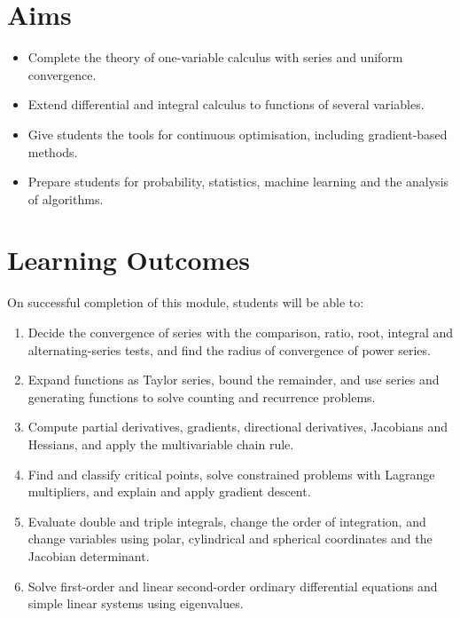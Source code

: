 \documentclass[11pt,a4paper]{article}
\begin{document}
\section{Aims}
\begin{itemize}
  \item Complete the theory of one-variable calculus with series and uniform convergence.
  \item Extend differential and integral calculus to functions of several variables.
  \item Give students the tools for continuous optimisation, including gradient-based methods.
  \item Prepare students for probability, statistics, machine learning and the analysis of algorithms.
\end{itemize}

\section{Learning Outcomes}
On successful completion of this module, students will be able to:
\begin{enumerate}[label=LO\arabic*.]
  \item Decide the convergence of series with the comparison, ratio, root, integral and alternating-series tests, and find the radius of convergence of power series.
  \item Expand functions as Taylor series, bound the remainder, and use series and generating functions to solve counting and recurrence problems.
  \item Compute partial derivatives, gradients, directional derivatives, Jacobians and Hessians, and apply the multivariable chain rule.
  \item Find and classify critical points, solve constrained problems with Lagrange multipliers, and explain and apply gradient descent.
  \item Evaluate double and triple integrals, change the order of integration, and change variables using polar, cylindrical and spherical coordinates and the Jacobian determinant.
  \item Solve first-order and linear second-order ordinary differential equations and simple linear systems using eigenvalues.
\end{enumerate}
\end{document}
